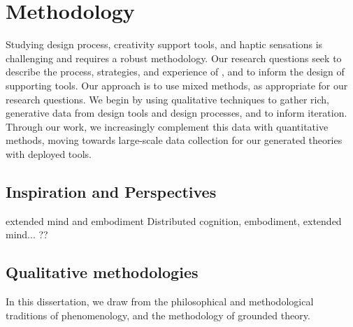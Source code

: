 %
%
\section{Methodology}

Studying design process, creativity support tools, and haptic sensations is challenging and requires a robust methodology.
Our research questions seek to describe the process, strategies, and experience of \haxd, and to inform the design of supporting tools.
Our approach is to use mixed methods, as appropriate for our research questions.
We begin by using qualitative techniques to gather rich, generative data from design tools and design processes, and to inform iteration.
Through our work, we increasingly complement this data with quantitative methods, moving towards large-scale data collection for our generated theories with deployed tools.


\subsection{Inspiration and Perspectives}

extended mind and embodiment
Distributed cognition, embodiment, extended mind...
??

\subsection{Qualitative methodologies}
In this dissertation, we draw from the philosophical and methodological traditions of phenomenology, and the methodology of grounded theory.


